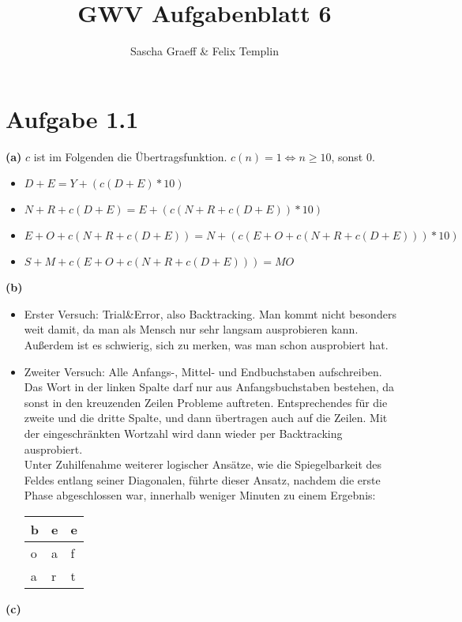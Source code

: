 \documentclass[a4paper,10pt]{article}
\title{GWV Aufgabenblatt 6}
\author{Sascha Graeff \& Felix Templin}
\begin{document}
\maketitle

\section*{Aufgabe 1.1}
\textbf{(a)}
$c$ ist im Folgenden die Übertragsfunktion. $c(n) = 1 \Leftrightarrow n \geq 10$, sonst $0$.
 \begin{itemize}
  \item $D + E = Y + (c(D+E) * 10)$
  \item $N + R + c(D+E) = E + (c(N + R + c(D+E)) * 10)$
  \item $E + O + c(N + R + c(D+E)) = N + (c(E + O + c(N + R + c(D+E))) * 10)$
  \item $S + M + c(E + O + c(N + R + c(D+E))) = MO$
 \end{itemize}
\textbf{(b)}
\begin{itemize}
  \item Erster Versuch: Trial\&Error, also Backtracking. Man kommt nicht besonders weit damit, da man als Mensch nur sehr langsam ausprobieren kann. Außerdem ist es schwierig, sich zu merken, was man schon ausprobiert hat.
  \item Zweiter Versuch: Alle Anfangs-, Mittel- und Endbuchstaben aufschreiben. Das Wort in der linken Spalte darf nur aus Anfangsbuchstaben bestehen, da sonst in den kreuzenden Zeilen Probleme auftreten.
          Entsprechendes für die zweite und die dritte Spalte, und dann übertragen auch auf die Zeilen.
          Mit der eingeschränkten Wortzahl wird dann wieder per Backtracking ausprobiert.\\
          Unter Zuhilfenahme weiterer logischer Ansätze, wie die Spiegelbarkeit des Feldes entlang seiner Diagonalen, führte dieser Ansatz, nachdem die erste Phase abgeschlossen war, innerhalb weniger Minuten zu einem Ergebnis:

\begin{tabular}{ | l | l | l | }
\hline
b & e & e \\ \hline
o & a & f \\ \hline
a & r & t \\ \hline
\end{tabular}
\end{itemize}
\textbf{(c)}
\end{document}
